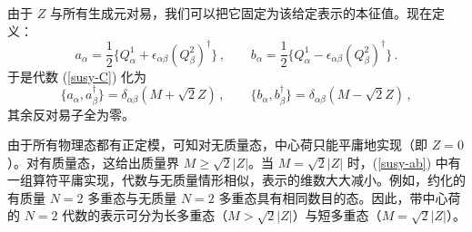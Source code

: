 
由于 $Z$ 与所有生成元对易，我们可以把它固定为该给定表示的本征值。现在定义：
$$
a_\alpha=\frac{1}{2} \{ Q^1_\alpha +
\epsilon_{\alpha\beta} (Q^2_\beta)^\dagger \}\,, \qquad
b_\alpha=\frac{1}{2} \{ Q_\alpha^1 -
\epsilon_{\alpha\beta} (Q^2_\beta)^\dagger \}\,. 
$$
于是代数 (\ref{susy-C}) 化为
\begin{equation}
\{a_\alpha,a^\dagger_\beta\}=\delta_{\alpha\beta}(M+{\sqrt 2}Z)\,,\qquad
\{ b_\alpha,b^\dagger_\beta\}=\delta_{\alpha\beta} (M-{\sqrt 2}Z)\,,
\label{susy-ab}
\end{equation}
其余反对易子全为零。


由于所有物理态都有正定模，可知对无质量态，中心荷只能平庸地实现（即 $Z=0$）。对有质量态，这给出质量界 $M\geq {\sqrt 2}|Z|$。当
$M={\sqrt 2}|Z|$ 时，(\ref{susy-ab}) 中有一组算符平庸实现，代数与无质量情形相似，表示的维数大大减小。例如，约化的有质量 $N = 2$ 多重态与无质量 $N = 2$ 多重态具有相同数目的态。因此，带中心荷的 $N=2$ 代数的表示可分为长多重态（$M >
{\sqrt 2}|Z|$）与短多重态（$M={\sqrt 2}|Z|$）。

